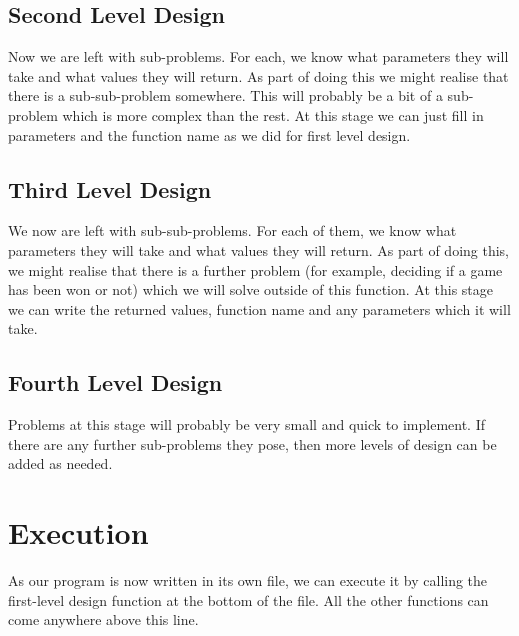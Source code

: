 \subsection*{Second Level Design}
Now we are left with sub-problems. For each, we know what parameters they will take and what values they will return. As part of doing this we might realise that there is a sub-sub-problem somewhere. This will probably be a bit of a sub-problem which is more complex than the rest. At this stage we can just fill in parameters and the function name as we did for first level design.
\subsection*{Third Level Design}
We now are left with sub-sub-problems. For each of them, we know what parameters they will take and what values they will return. As part of doing this, we might realise that there is a further problem (for example, deciding if a game has been won or not) which we will solve outside of this function. At this stage we can write the returned values, function name and any parameters which it will take.
\subsection*{Fourth Level Design}
Problems at this stage will probably be very small and quick to implement. If there are any further sub-problems they pose, then more levels of design can be added as needed.

\section*{Execution}
As our program is now written in its own file, we can execute it by calling the first-level design function at the bottom of the file. All the other functions can come anywhere above this line. 